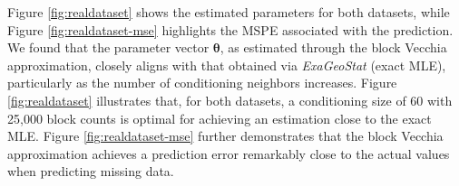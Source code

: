 \documentclass[12pt]{article}
\begin{document}
Figure \ref{fig:realdataset} shows the estimated parameters for both datasets, while Figure \ref{fig:realdataset-mse} highlights the MSPE associated with the prediction. We found that the parameter vector $\boldsymbol\theta$, as estimated through the block Vecchia approximation, closely aligns with that obtained via {\it ExaGeoStat} (exact MLE), particularly as the number of conditioning neighbors increases. Figure \ref{fig:realdataset} illustrates that, for both datasets, a conditioning size of 60 with 25,000 block counts is optimal for achieving an estimation close to the exact MLE. Figure \ref{fig:realdataset-mse} further demonstrates that the block Vecchia approximation achieves a prediction error remarkably close to the actual values when predicting missing data. 

\end{document}
